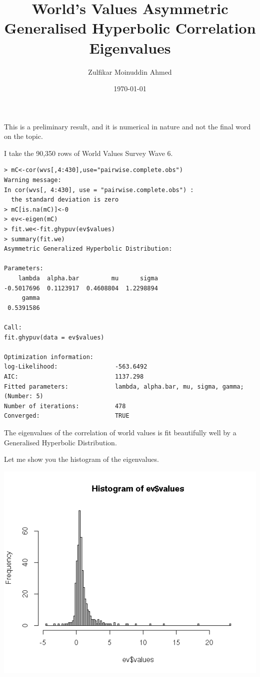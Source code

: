 \documentclass{amsart}
\title{World's Values Asymmetric Generalised Hyperbolic Correlation Eigenvalues}
\author{Zulfikar Moinuddin Ahmed}
\date{\today}
\begin{document}
\maketitle

This is a preliminary result, and it is numerical in nature and not the final word on the topic.

I take the 90,350 rows of World Values Survey Wave 6.

\begin{verbatim}
> mC<-cor(wvs[,4:430],use="pairwise.complete.obs")
Warning message:
In cor(wvs[, 4:430], use = "pairwise.complete.obs") :
  the standard deviation is zero
> mC[is.na(mC)]<-0
> ev<-eigen(mC)
> fit.we<-fit.ghypuv(ev$values)
> summary(fit.we)
Asymmetric Generalized Hyperbolic Distribution:

Parameters:
    lambda  alpha.bar         mu      sigma 
-0.5017696  0.1123917  0.4608804  1.2298894 
     gamma 
 0.5391586 

Call:
fit.ghypuv(data = ev$values)

Optimization information:
log-Likelihood:                -563.6492 
AIC:                           1137.298 
Fitted parameters:             lambda, alpha.bar, mu, sigma, gamma;  (Number: 5)
Number of iterations:          478 
Converged:                     TRUE 
\end{verbatim}
The eigenvalues of the correlation of world values is fit beautifully well by a Generalised Hyperbolic Distribution.

Let me show you the histogram of the eigenvalues.

\includegraphics[scale=1.0]{wvseig.png}
\end{document}
